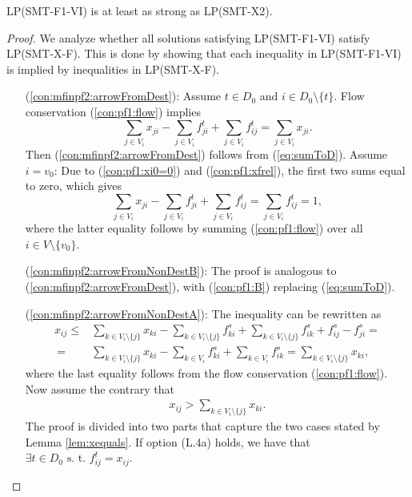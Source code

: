 \begin{prop}
\label{prop:f1strx2}
LP(SMT-F1-VI) is at least as strong as LP(SMT-X2). 
\end{prop}
\begin{proof}
We analyze whether all solutions satisfying LP(SMT-F1-VI) satisfy LP(SMT-X-F). This is done by showing that each inequality in LP(SMT-F1-VI) is implied by inequalities in LP(SMT-X-F).

\begin{itemize}[leftmargin=1cm]
\item[ (\ref{con:mfinpf2:arrowFromDest}):] Assume $t\in D_0$ and $i\in D_0\setminus\{t\}$. Flow conservation (\ref{con:pf1:flow}) implies
$$\sum_{j\in V_i}x_{ji} - \sum_{j\in V_i}f_{ji}^t + \sum_{j\in V_i}f_{ij}^t = \sum_{j\in V_i}x_{ji}.$$ Then (\ref{con:mfinpf2:arrowFromDest}) follows from (\ref{eq:sumToD}).
Assume $i=v_0$: Due to (\ref{con:pf1:xi0=0}) and (\ref{con:pf1:xfrel}), the first two sums equal to zero, which gives
$$\sum_{j\in V_i}x_{ji} - \sum_{j\in V_i}f_{ji}^t + \sum_{j\in V_i}f_{ij}^t = \sum_{j\in V_i}f_{ij}^t = 1,$$
where the latter equality follows by summing (\ref{con:pf1:flow}) over all $i\in V\setminus\{v_0\}$.
\item[ (\ref{con:mfinpf2:arrowFromNonDestB}):] The proof is analogous to (\ref{con:mfinpf2:arrowFromDest}), with (\ref{con:pf1:B}) replacing (\ref{eq:sumToD}).
\item[ (\ref{con:mfinpf2:arrowFromNonDestA}):] The inequality can be rewritten as
\begin{align*}
 x_{ij}  \leq& \sum\limits_{k \in V_i\setminus\{j\}}x_{ki}-\sum\limits_{k \in V_i\setminus\{j\}}f^s_{ki}+\sum\limits_{k \in V_i\setminus\{j\}}f^s_{ik} +f^s_{ij}-f^s_{ji} = \\
 ~=& \sum\limits_{k \in V_i\setminus\{j\}}x_{ki}-\sum\limits_{k \in V_i}f^s_{ki}+\sum\limits_{k \in V_i}f^s_{ik} = \sum\limits_{k \in V_i\setminus\{j\}}x_{ki},
\end{align*}
where the last equality follows from the flow conservation (\ref{con:pf1:flow}). Now assume the contrary that
\begin{align}
x_{ij} > \sum\limits_{k \in V_i\setminus\{j\}}x_{ki}.\label{eq:assumContr}\tag{B}
\end{align}
The proof is divided into two parts that capture the two cases stated by Lemma \ref{lem:xequals}. If option (L.4a) holds, we have that $\exists t\in D_0 \text{ s. t. }f^t_{ij}=x_{ij}$.

\end{itemize}
\end{proof}
